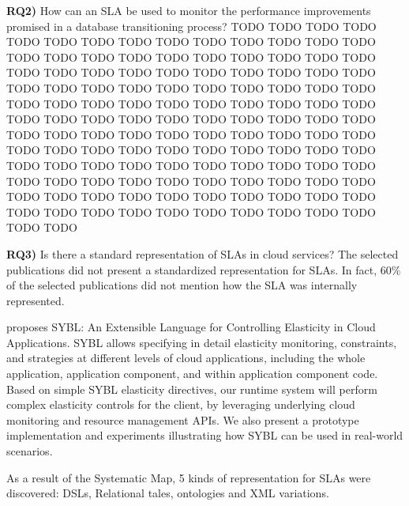 \documentclass{article}
\begin{document}
\textbf{RQ2)} How can an SLA be used to monitor the performance improvements promised in a database transitioning process?
TODO TODO TODO TODO TODO TODO TODO TODO TODO TODO TODO TODO TODO TODO TODO TODO TODO TODO TODO TODO TODO TODO TODO TODO TODO TODO TODO TODO TODO TODO TODO TODO TODO TODO TODO TODO TODO TODO TODO TODO TODO TODO TODO TODO TODO TODO TODO TODO TODO TODO TODO TODO TODO TODO TODO TODO TODO TODO TODO TODO TODO TODO TODO TODO TODO TODO TODO TODO TODO TODO TODO TODO TODO TODO TODO TODO TODO TODO TODO TODO TODO TODO TODO TODO TODO TODO TODO TODO TODO TODO TODO TODO TODO TODO TODO TODO TODO TODO TODO TODO TODO TODO TODO TODO TODO TODO TODO TODO TODO TODO TODO TODO TODO TODO TODO TODO TODO TODO TODO TODO TODO TODO TODO TODO TODO TODO 



\textbf{RQ3)} Is there a standard representation of SLAs in cloud services? 
The selected publications did not present a standardized representation for SLAs. In fact, 60\% of the selected publications did not mention how the SLA was internally represented. 

\cite{6546068} proposes SYBL: An Extensible Language for Controlling Elasticity in Cloud Applications. SYBL allows specifying in detail elasticity monitoring, constraints, and strategies at different levels of cloud applications, including the whole application, application component, and within application component code. Based on simple SYBL elasticity directives, our runtime system will perform complex elasticity controls for the client, by leveraging underlying cloud monitoring and resource management APIs. We also present a prototype implementation and experiments illustrating how SYBL can be used in real-world scenarios. \cite{koala}

As a result of the Systematic Map, 5 kinds of representation for SLAs were discovered: DSLs, Relational tales, ontologies and XML variations.




	
\end{document}
